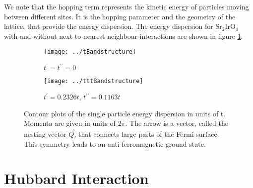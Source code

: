 We note that the hopping term represents the kinetic energy of particles moving between different sites. 
It is the hopping parameter and the 
geometry of the lattice, that provide the energy dispersion. 
The energy dispersion for Sr$_2$IrO$_4$  with and without next-to-nearest neighbour interactions are shown in figure \ref{fig:energie_dispersion}.



\begin{figure} \centering
\begin{subfigure}{0.49\linewidth} \centering
 \texttt{[image: ../tBandstructure]}
 \caption{$ t^{\prime}=t^{\prime \prime} =0$ }
\end{subfigure}
\begin{subfigure}{0.49\linewidth}
\texttt{[image: ../tttBandstructure]}
  \caption{ $t^{\prime}= 0.2326t$, $t^{\prime \prime} = 0.1163t$}
\end{subfigure}
\caption{
Contour plots of the single particle energy dispersion in units of t. Momenta are given in units of $2\pi$.
The arrow is a vector, called the nesting vector $\vec Q$, that connects large parts of the
Fermi surface. This symmetry leads to an anti-ferromagnetic ground state.}
\label{fig:energie_dispersion}
\end{figure}




\section{Hubbard Interaction}

